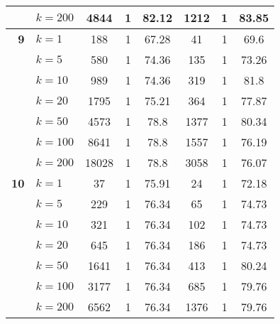 \begin{table}[htbp]
\begin{tabular}{|l|l|c|c|c|c|c|c|}
     & $k=200$ & 4844 & 1 & 82.12 & 1212 & 1 & 83.85 \\ \hline
    \multicolumn{1}{|r|}{\textbf{9}} & $k=1$ & 188 & 1 & 67.28 & 41 & 1 & 69.6 \\ 
     & $k=5$ & 580 & 1 & 74.36 & 135 & 1 & 73.26 \\ 
     & $k=10$ & 989 & 1 & 74.36 & 319 & 1 & 81.8 \\ 
     & $k=20$ & 1795 & 1 & 75.21 & 364 & 1 & 77.87 \\ 
     & $k=50$ & 4573 & 1 & 78.8 & 1377 & 1 & 80.34 \\ 
     & $k=100$ & 8641 & 1 & 78.8 & 1557 & 1 & 76.19 \\ 
     & $k=200$ & 18028 & 1 & 78.8 & 3058 & 1 & 76.07 \\ \hline
    \multicolumn{1}{|r|}{\textbf{10}} & $k=1$ & 37 & 1 & 75.91 & 24 & 1 & 72.18 \\ 
     & $k=5$ & 229 & 1 & 76.34 & 65 & 1 & 74.73 \\ 
     & $k=10$ & 321 & 1 & 76.34 & 102 & 1 & 74.73 \\ 
     & $k=20$ & 645 & 1 & 76.34 & 186 & 1 & 74.73 \\ 
     & $k=50$ & 1641 & 1 & 76.34 & 413 & 1 & 80.24 \\ 
     & $k=100$ & 3177 & 1 & 76.34 & 685 & 1 & 79.76 \\ 
     & $k=200$ & 6562 & 1 & 76.34 & 1376 & 1 & 79.76 \\ \hline
    \end{tabular}
\end{table}
